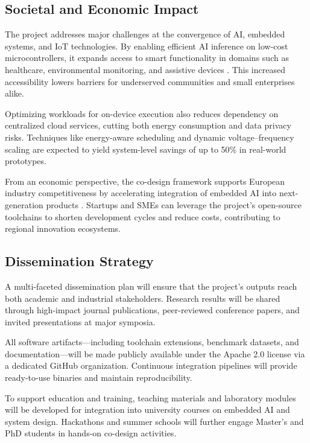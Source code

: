 \subsection{Societal and Economic Impact}

The project addresses major challenges at the convergence of AI, embedded systems, and IoT technologies. By enabling efficient AI inference on low-cost microcontrollers, it expands access to smart functionality in domains such as healthcare, environmental monitoring, and assistive devices \cite{Lu2022semi}. This increased accessibility lowers barriers for underserved communities and small enterprises alike.

Optimizing workloads for on-device execution also reduces dependency on centralized cloud services, cutting both energy consumption and data privacy risks. Techniques like energy-aware scheduling and dynamic voltage–frequency scaling are expected to yield system-level savings of up to 50\% in real-world prototypes.

From an economic perspective, the co-design framework supports European industry competitiveness by accelerating integration of embedded AI into next-generation products \cite{Luo2021hscn}. Startups and SMEs can leverage the project’s open-source toolchains to shorten development cycles and reduce costs, contributing to regional innovation ecosystems.

\subsection{Dissemination Strategy}

A multi-faceted dissemination plan will ensure that the project’s outputs reach both academic and industrial stakeholders. Research results will be shared through high-impact journal publications, peer-reviewed conference papers, and invited presentations at major symposia.

All software artifacts—including toolchain extensions, benchmark datasets, and documentation—will be made publicly available under the Apache 2.0 license via a dedicated GitHub organization. Continuous integration pipelines will provide ready-to-use binaries and maintain reproducibility.

To support education and training, teaching materials and laboratory modules will be developed for integration into university courses on embedded AI and system design. Hackathons and summer schools will further engage Master’s and PhD students in hands-on co-design activities.

